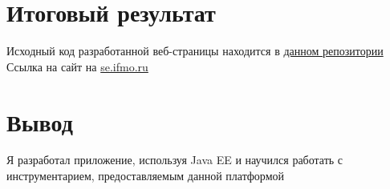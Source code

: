 \documentclass[12pt,a4paper]{report}
\begin{document}
\section*{Итоговый результат}
Исходный код разработанной веб-страницы находится в \href{https://github.com/Armemius/ItmoStuff/tree/main/web/lab2}{данном репозитории} \\
\hfill\break
Ссылка на сайт на \href{https://se.ifmo.ru/~s368849/lab2/}{se.ifmo.ru}
\section*{Вывод}
Я разработал приложение, используя Java EE и научился работать с инструментарием, предоставляемым данной платформой
\end{document}
